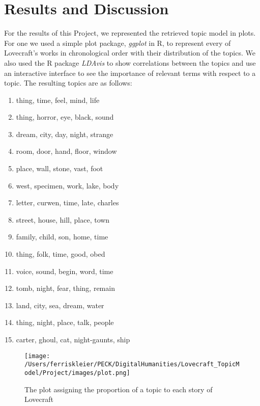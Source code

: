 \section{Results and Discussion}

For the results of this Project, we represented the retrieved topic model in plots. For one we 
used a simple plot package, \textit{ggplot} in R, to represent every of Lovecraft's works in chronological 
order with their distribution of the topics. We also used the R package \textit{LDAvis} to show correlations 
between the topics and use an interactive interface to see the importance of relevant terms with 
respect to a topic. The resulting topics are as follows:

\begin{enumerate}
    \itemsep0em
    \item thing, time, feel, mind, life
    \item thing, horror, eye, black, sound
    \item dream, city, day, night, strange
    \item room, door, hand, floor, window
    \item place, wall, stone, vast, foot
    \item west, specimen, work, lake, body
    \item letter, curwen, time, late, charles
    \item street, house, hill, place, town
    \item family, child, son, home, time
    \item thing, folk, time, good, obed
    \item voice, sound, begin, word, time
    \item tomb, night, fear, thing, remain
    \item land, city, sea, dream, water
    \item thing, night, place, talk, people
    \item carter, ghoul, cat, night-gaunts, ship
\end{enumerate}

\begin{figure}[ht]
    \centering
    \texttt{[image: /Users/ferriskleier/PECK/DigitalHumanities/Lovecraft\_TopicModel/Project/images/plot.png]}
    \caption{The plot assigning the proportion of a topic to each story of Lovecraft}
    \label{fig:mesh1}
\end{figure}


